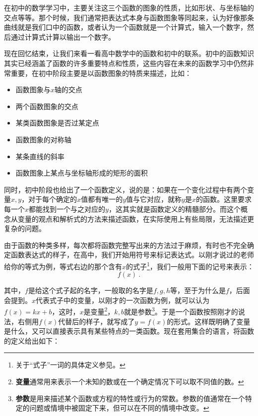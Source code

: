 在初中的数学学习中，主要关注这三个函数的图象的性质，比如形状、与坐标轴的交点等等。那个时候，我们通常把表达式本身与函数图象等同起来，认为好像那条曲线就是我们口中的函数，或者认为一个函数就是一个计算式，输入一个数字，然后通过计算式计算以输出一个数字。

现在回忆结束，让我们来看一看高中数学中的函数和初中的联系。初中的函数知识其实已经涵盖了函数的许多重要特点和性质，这些内容在未来的函数学习中仍然非常重要，在初中阶段主要是以函数图象的特质来描述，比如：
\begin{itemize}
\item 函数图象与$x$轴的交点
\item 两个函数图象的交点
\item 某类函数图象是否过某定点
\item 函数图象的对称轴
\item 某条直线的斜率
\item 函数图象上某点与坐标轴形成的矩形的面积
\end{itemize}

同时，初中阶段也给出了一个函数定义，说的是：如果在一个变化过程中有两个变量$x,y$，对于每个确定的$x$值都有唯一的$y$值与它对应，就称$y$是$x$的函数。这里要求每一个$x$都能找到一个与之对应的$y$，这其实就是函数定义的精髓部分。而这个概念从变量的观点和解析式的方法来描述函数，在实际使用上有些局限，无法描述更复杂的问题。

由于函数的种类多样，每次都将函数完整写出来的方法过于麻烦，有时也不完全确定函数表达式的样子，在高中，我们开始用符号来标记表达式。以刚才说过的老师给你的等式为例，等式右边的那个含有$x$的式子\footnote{关于“式子”一词的具体定义参见。}，我们一般用下面的记号来表示：
\begin{equation}
f(x)~.
\end{equation}

其中，$f$是给这个式子起的名字，一般取的名字是$f,g,h$等，至于为什么是$f$，后面会提到。$x$代表式子中的变量，以刚才的一次函数为例，就可以认为$f(x)=kx+b$，这时，$x$是变量\footnote{\textbf{变量}通常用来表示一个未知的数或在一个确定情况下可以取不同值的数。}，$k,b$就是参数\footnote{\textbf{参数}是用来描述某个函数或方程的特性或行为的常数。参数的值通常在一个特定的问题或情境中被固定下来，但可以在不同的情境中改变。}。于是一个函数按照刚才的说法，右侧用$f(x)$代替后的样子，就写成了$y=f(x)$的形式。这样既明确了变量是什么，又可以直接表示具有某些特点的一类函数。现在套用集合的语言，将函数的定义给出如下：

